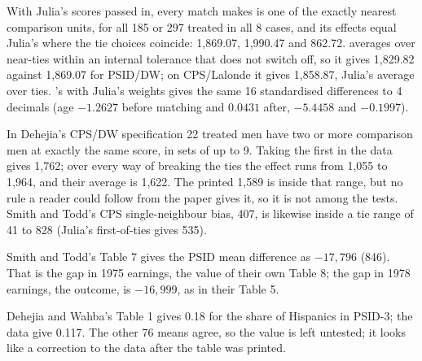 With Julia's scores passed in, every match  makes is one of the exactly nearest comparison units, for all 185
or 297 treated in all 8 cases, and its effects equal Julia's where the tie choices coincide: 1,869.07, 1,990.47 and
862.72.  averages over near-ties within an internal tolerance that  does not switch
off, so it gives 1,829.82 against 1,869.07 for PSID/DW; on CPS/Lalonde it gives 1,858.87, Julia's average over ties.
's  with Julia's weights gives the same 16 standardised differences to 4 decimals (age $-1.2627$
before matching and $0.0431$ after,  $-5.4458$ and $-0.1997$).

In Dehejia's CPS/DW specification 22 treated men have two or more comparison men at exactly the same score, in sets of up
to 9. Taking the first in the data gives 1,762; over every way of breaking the ties the effect runs from 1,055 to 1,964,
and their average is 1,622. The printed 1,589 is inside that range, but no rule a reader could follow from the paper gives
it, so it is not among the tests. Smith and Todd's CPS single-neighbour bias, 407, is likewise inside a tie range of 41 to
828 (Julia's first-of-ties gives 535).

Smith and Todd's Table 7 gives the PSID mean difference as $-17{,}796$ (846). That is the gap in 1975 earnings, the value
of their own Table 8; the gap in 1978 earnings, the outcome, is $-16{,}999$, as in their Table 5.

Dehejia and Wahba's Table 1 gives 0.18 for the share of Hispanics in PSID-3; the data give 0.117. The other 76 means
agree, so the value is left untested; it looks like a correction to the data after the table was printed.

